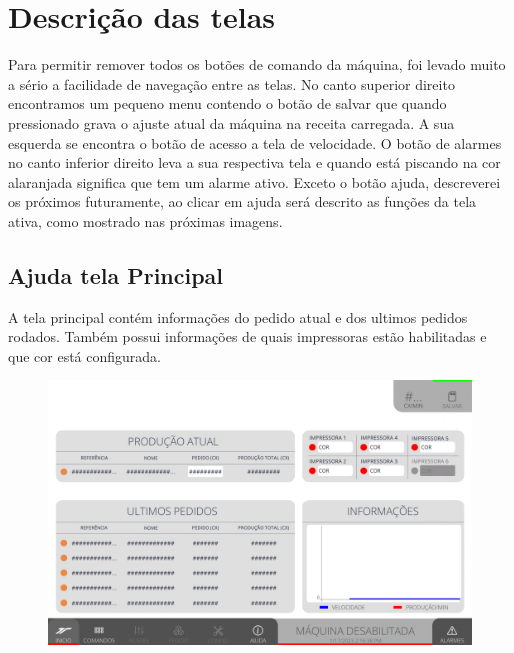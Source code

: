 \thispagestyle{fancy}

\vspace*{40 pt}

\section{\large{Descrição das telas}}

Para permitir remover todos os botões de comando da máquina, foi levado muito a sério a facilidade de navegação entre as telas.
No canto superior direito encontramos um pequeno menu contendo o botão de salvar que quando pressionado grava o ajuste atual da
máquina na receita carregada. A sua esquerda se encontra o botão de acesso a tela de velocidade.
O botão de alarmes no canto inferior direito leva a sua respectiva tela e quando está piscando na cor alaranjada significa
que tem um alarme ativo. Exceto o botão ajuda, descreverei os próximos futuramente, ao clicar em ajuda será descrito as
funções da tela ativa, como mostrado nas próximas imagens.
\subsection{Ajuda tela Principal}
A tela principal contém informações do pedido atual e dos ultimos pedidos rodados. Também
possui informações de quais impressoras estão habilitadas e que cor está configurada.
\vspace*{\fill}
\begin{figure}[h]
    \centering
    \includegraphics[width=480 px,height=300 px]{src/imagesICV/01-main/1.png}
\end{figure}
\vspace*{\fill}

\newpage
\thispagestyle{fancy}
\vspace*{40 pt}
